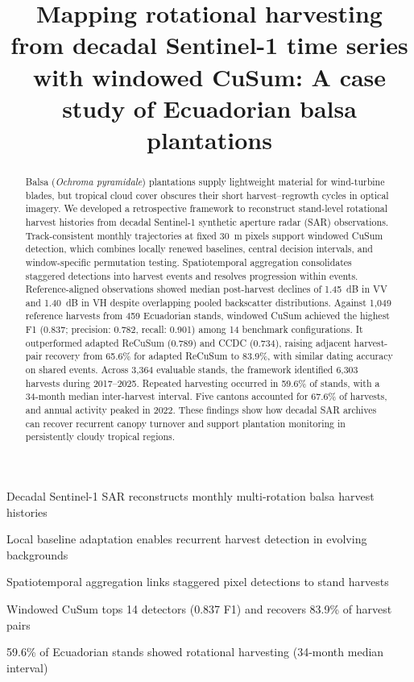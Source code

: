 \documentclass[a4paper,fleqn]{cas-sc}
\begin{document}

\title[mode=title]{Mapping rotational harvesting from decadal Sentinel-1 time series with windowed CuSum: A case study of Ecuadorian balsa plantations}

\begin{abstract}
  Balsa (\textit{Ochroma pyramidale}) plantations supply lightweight material for wind-turbine blades, but tropical cloud cover obscures their short harvest--regrowth cycles in optical imagery. We developed a retrospective framework to reconstruct stand-level rotational harvest histories from decadal Sentinel-1 synthetic aperture radar (SAR) observations. Track-consistent monthly trajectories at fixed 30~m pixels support windowed CuSum detection, which combines locally renewed baselines, central decision intervals, and window-specific permutation testing. Spatiotemporal aggregation consolidates staggered detections into harvest events and resolves progression within events. Reference-aligned observations showed median post-harvest declines of 1.45~dB in VV and 1.40~dB in VH despite overlapping pooled backscatter distributions. Against 1,049 reference harvests from 459 Ecuadorian stands, windowed CuSum achieved the highest F1 (0.837; precision: 0.782, recall: 0.901) among 14 benchmark configurations. It outperformed adapted ReCuSum (0.789) and CCDC (0.734), raising adjacent harvest-pair recovery from 65.6\% for adapted ReCuSum to 83.9\%, with similar dating accuracy on shared events. Across 3,364 evaluable stands, the framework identified 6,303 harvests during 2017--2025. Repeated harvesting occurred in 59.6\% of stands, with a 34-month median inter-harvest interval. Five cantons accounted for 67.6\% of harvests, and annual activity peaked in 2022. These findings show how decadal SAR archives can recover recurrent canopy turnover and support plantation monitoring in persistently cloudy tropical regions.
\end{abstract}

\begin{highlights}
  \item Decadal Sentinel-1 SAR reconstructs monthly multi-rotation balsa harvest histories
  \item Local baseline adaptation enables recurrent harvest detection in evolving backgrounds
  \item Spatiotemporal aggregation links staggered pixel detections to stand harvests
  \item Windowed CuSum tops 14 detectors (0.837 F1) and recovers 83.9\% of harvest pairs
  \item 59.6\% of Ecuadorian stands showed rotational harvesting (34-month median interval)
\end{highlights}
\end{document}
